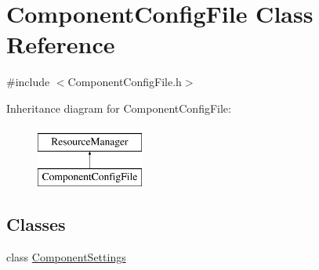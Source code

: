 \hypertarget{classComponentConfigFile}{}\section{Component\+Config\+File Class Reference}
\label{classComponentConfigFile}


{\ttfamily \#include $<$Component\+Config\+File.\+h$>$}

Inheritance diagram for Component\+Config\+File\+:\begin{figure}[H]
\begin{center}
\leavevmode
\includegraphics[height=2.000000cm]{classComponentConfigFile}
\end{center}
\end{figure}
\subsection*{Classes}
\begin{DoxyCompactItemize}
\item 
class \mbox{\hyperlink{classComponentConfigFile_1_1ComponentSettings}{Component\+Settings}}
\end{DoxyCompactItemize}
